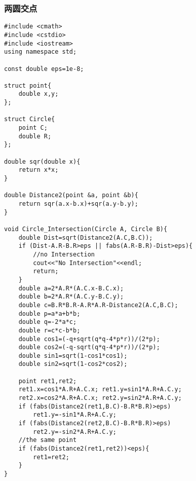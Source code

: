\subsubsection{两圆交点} 
\begin{verbatim}
#include <cmath>
#include <cstdio>
#include <iostream>
using namespace std;

const double eps=1e-8;

struct point{
    double x,y;
};

struct Circle{
    point C;
    double R;
};

double sqr(double x){
    return x*x;
}

double Distance2(point &a, point &b){
    return sqr(a.x-b.x)+sqr(a.y-b.y);
}

void Circle_Intersection(Circle A, Circle B){
    double Dist=sqrt(Distance2(A.C,B.C));
    if (Dist-A.R-B.R>eps || fabs(A.R-B.R)-Dist>eps){
        //no Intersection
        cout<<"No Intersection"<<endl;
        return;
    }
    double a=2*A.R*(A.C.x-B.C.x);
    double b=2*A.R*(A.C.y-B.C.y);
    double c=B.R*B.R-A.R*A.R-Distance2(A.C,B.C);
    double p=a*a+b*b;
    double q=-2*a*c;
    double r=c*c-b*b;
    double cos1=(-q+sqrt(q*q-4*p*r))/(2*p);
    double cos2=(-q-sqrt(q*q-4*p*r))/(2*p);
    double sin1=sqrt(1-cos1*cos1);
    double sin2=sqrt(1-cos2*cos2);

    point ret1,ret2;
    ret1.x=cos1*A.R+A.C.x; ret1.y=sin1*A.R+A.C.y;
    ret2.x=cos2*A.R+A.C.x; ret2.y=sin2*A.R+A.C.y;
    if (fabs(Distance2(ret1,B.C)-B.R*B.R)>eps)
        ret1.y=-sin1*A.R+A.C.y;
    if (fabs(Distance2(ret2,B.C)-B.R*B.R)>eps)
        ret2.y=-sin2*A.R+A.C.y;
    //the same point
    if (fabs(Distance2(ret1,ret2))<eps){
        ret1=ret2;
    }
}
\end{verbatim}
